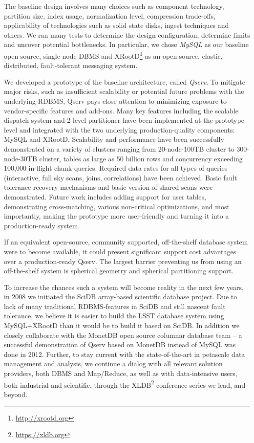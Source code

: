 \documentclass[DM,lsstdraft,toc]{lsstdoc}
\begin{document}
The baseline design involves many choices such as component technology,
partition size, index usage, normalization level, compression
trade-offs, applicability of technologies such as solid state disks,
ingest techniques and others. We ran many tests to determine the design
configuration, determine limits and uncover potential bottlenecks. In
particular, we chose \emph{MySQL} as our baseline open source,
single-node DBMS and XRootD\footnote{\url{http://xrootd.org}} \citep{Dorigo:2005:XRootd}
as an open source, elastic, distributed, fault-tolerant messaging system.

We developed a prototype of the baseline architecture, called
\emph{Qserv}. To mitigate major risks, such as insufficient scalability
or potential future problems with the underlying RDBMS, Qserv pays close
attention to minimizing exposure to vendor-specific features and
add-ons. Many key features including the scalable dispatch system and
2-level partitioner have been implemented at the prototype level and
integrated with the two underlying production-quality components: MySQL
and XRootD. Scalability and performance have
been successfully demonstrated on a variety of clusters ranging from
20-node-100TB cluster to 300-node-30TB cluster, tables as large as 50
billion rows and concurrency exceeding 100,000 in-flight chunk-queries.
Required data rates for all types of queries (interactive, full sky
scans, joins, correlations) have been achieved. Basic fault tolerance
recovery mechanisms and basic version of shared scans were demonstrated.
Future work includes adding support for user tables, demonstrating
cross-matching, various non-critical optimizations, and most
importantly, making the prototype more user-friendly and turning it into
a production-ready system.

If an equivalent open-source, community supported, off-the-shelf
database system were to become available, it could present significant
support cost advantages over a production-ready Qserv. The largest
barrier preventing us from using an off-the-shelf system is spherical
geometry and spherical partitioning support.

To increase the chances such a system will become reality in the next
few years, in 2008 we initiated the SciDB array-based scientific
database project. Due to lack of many traditional RDBMS-features in
SciDB and still nascent fault tolerance, we believe it is easier to
build the LSST database system using
MySQL+XRootD than it would be to build it
based on SciDB. In addition we closely collaborate with the MonetDB open
source columnar database team -- a successful demonstration of Qserv
based on MonetDB instead of MySQL was done in 2012. Further, to stay
current with the state-of-the-art in petascale data management and
analysis, we continue a dialog with all relevant solution providers,
both DBMS and Map/Reduce, as well as with data-intensive users, both
industrial and scientific, through the XLDB\footnote{\url{https://xldb.org}}
conference series we lead, and beyond.
\end{document}
